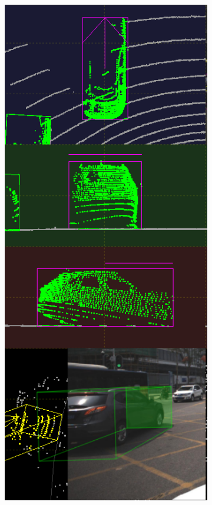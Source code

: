\documentclass[letterpaper, 10 pt, conference]{ieeeconf}  %
\begin{document}
\begin{figure}[th]
	\centering
	\begin{subfigure}{0.16\linewidth}
		\includegraphics[scale=0.12]{./figures/transfer/car-ref}
		\caption{}
	\end{subfigure}
	~
	\begin{subfigure}{0.16\linewidth}

\end{subfigure}
\end{figure}
\end{document}

